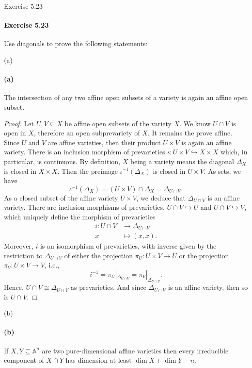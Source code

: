 \documentclass[12pt]{article}
\newenvironment{fullbox}{\begin{lrbox}{\savefullbox}\begin{minipage}{\dimexpr\textwidth-2\fboxsep\relax}}{\end{minipage}\end{lrbox}\begin{center}\framebox[\textwidth]{\usebox{\savefullbox}}\end{center}}
\newenvironment{pbox}[1][]{\begin{fullbox}\ifx#1\empty\else\paragraph{#1}\fi}{\end{fullbox}}
\newcommand{\<}{\langle}
\renewcommand{\>}{\rangle}
\newcommand{\isom}{\cong}
\newcommand{\A}{\mathbb{A}}
\newcommand{\inc}{\hookrightarrow}
\begin{document}
\thispagestyle{title}

\begin{pbox}[Exercise 5.23]
    Use diagonals to prove the following statements:
\end{pbox}

\begin{pbox}[(a)]
    The intersection of any two affine open subsets of a variety is again an affine open subset.
\end{pbox}



\begin{proof}
    Let $U, V \subseteq X$ be affine open subsets of the variety $X$. We know $U \cap V$ is open in $X$, therefore an open subprevariety of $X$. It remains the prove affine. Since $U$ and $V$ are affine varieties, then their product $U \times V$ is again an affine variety. There is an inclusion morphism of prevarieties $\iota : U \times V \inc X \times X$ which, in particular, is continuous. By definition, $X$ being a variety means the diagonal $\Delta_X$ is closed in $X \times X$. Then the preimage $\iota^{-1}(\Delta_X)$ is closed in $U \times V$. As sets, we have
    \[
        \iota^{-1}(\Delta_X)
            = (U \times V) \cap \Delta_X
            = \Delta_{U \cap V}.
    \]
    As a closed subset of the affine variety $U \times V$, we deduce that $\Delta_{U \cap V}$ is an affine variety. There are inclusion morphisms of prevarieties, $U \cap V \inc U$ and $U \cap V \inc V$, which uniquely define the morphism of prevarieties
    \begin{align*}
        i :  U \cap V &\to \Delta_{U \cap V} \\
            x &\mapsto (x, x).
    \end{align*}
    Moreover, $i$ is an isomorphism of prevarieties, with inverse given by the restriction to $\Delta_{U \cap V}$ of either the projection $\pi_U : U \times V \to U$ or the projection $\pi_V : U \times V \to V$, i.e.,
    \[
        i^{-1} = \pi_U|_{\Delta_{U \cap V}} = \pi_V|_{\Delta_{U \cap V}}.
    \]
    Hence, $U \cap V \isom \Delta_{U \cap V}$ as prevarieties. And since $\Delta_{U \cap V}$ is an affine variety, then so is $U \cap V$.

\end{proof}


\newpage
\begin{pbox}[(b)]
    If $X, Y \subseteq \A^n$ are two pure-dimensional affine varieties then every irreducible component of $X \cap Y$ has dimension at least $\dim X + \dim Y - n$.
\end{pbox}
\end{document}
